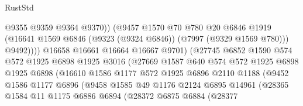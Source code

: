 \begin{lexlean}{RustStd}
\begin{coremodule}
                                    @9355
                                    @9359
                                    @9364
                                    @9370))
                                (@9457
                                  @1570
                                  @70
                                  @780
                                  @20
                                  @6846
                                  @1919
                                  (@16641
                                    @1569
                                    @6846
                                    (@9323 (@9324 @6846))
                                    (@7997 (@9329 @1569 @780)))
                                  @9492))))
                          @16658
                          @16661
                          @16664
                          @16667
                          @9701)
                        (@27745
                          @6852
                          @1590
                          @574
                          @572
                          @1925
                          @6898
                          @1925
                          @3016
                          (@27669
                            @1587
                            @640
                            @574
                            @572
                            @1925
                            @6898
                            @1925
                            @6898
                            (@16610
                              @1586
                              @1177
                              @572
                              @1925
                              @6896
                              @2110
                              @1188
                              (@9452
                                @1586
                                @1177
                                @6896
                                (@9458
                                  @1585
                                  @49
                                  @1176
                                  @2124
                                  @6895
                                  @14961
                                  (@28365
                                    @1584
                                    @11
                                    @1175
                                    @6886
                                    @6894
                                    (@28372
                                      @6875
                                      @6884
                                      (@28377

\end{coremodule}
\end{lexlean}
